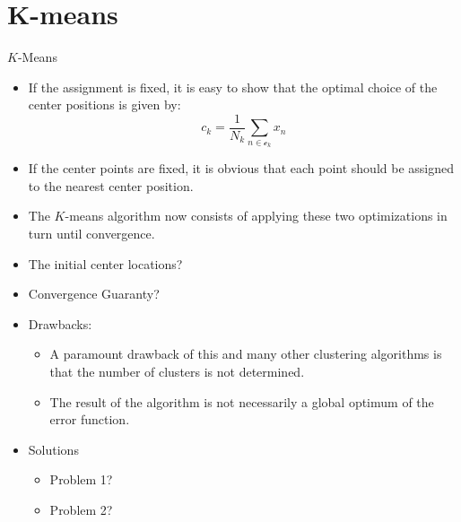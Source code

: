 \documentclass[compress,oilve]{beamer}
\newcommand{\tc}[2]{
	\textcolor{#1}{#2}
}
\begin{document}
\section{K-means}
\begin{frame}{$K$-Means}
	\begin{itemize}
	
		\item If the assignment is fixed, it is easy to show that the optimal choice of the center positions is given
		by:
		\begin{equation*}
			c_k = \frac{1}{N_k}\sum_{n\in\mathcal{c}_k}x_n
		\end{equation*}
		
		\item If the center points are fixed, it is obvious that each point should be assigned to the nearest center position.
		
		\medskip
		\item The $K$-means algorithm now consists of applying these two optimizations in turn until convergence.
		
		\medskip
		\item \tc{keywords}{The initial center locations?}
		
		\medskip
		\item \tc{keywords}{Convergence Guaranty?}
		
		\item \tc{keywords}{Drawbacks:}
		\begin{itemize}
			\item  A paramount drawback of this and many other clustering algorithms is that the number of clusters is not determined.
			
			\medskip
			\item  The result of the algorithm is not necessarily a global optimum of the error function.
		\end{itemize}
	
	\medskip
	\item \tc{keywords}{Solutions}
	\begin{itemize}
		\item Problem 1?
		
		\medskip
		\item 	Problem 2?
		
	\end{itemize}

	\end{itemize}

\end{frame}
\end{document}
